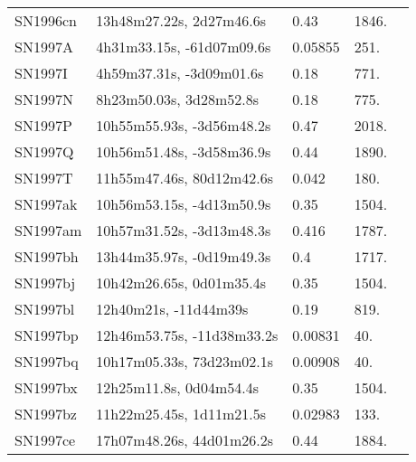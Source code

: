 \begin{longtable}{lllll}
         SN1996cn &       13h48m27.22s, 2d27m46.6s &     0.43 &          1846. &    \citet{1999ApJ...517..565P} \\
          SN1997A &      4h31m33.15s, -61d07m09.6s &  0.05855 &           251. &    \citet{2004AJ....128.1558S} \\
          SN1997I &       4h59m37.31s, -3d09m01.6s &     0.18 &           771. &    \citet{1997IAUC.6540A...1:} \\
          SN1997N &        8h23m50.03s, 3d28m52.8s &     0.18 &           775. &    \citet{1997IAUC.6540A...1:} \\
          SN1997P &      10h55m55.93s, -3d56m48.2s &     0.47 &          2018. &    \citet{1997IAUC.6540A...1:} \\
          SN1997Q &      10h56m51.48s, -3d58m36.9s &     0.44 &          1890. &    \citet{1997IAUC.6540A...1:} \\
          SN1997T &      11h55m47.46s, 80d12m42.6s &    0.042 &           180. &    \citet{1997IAUC.6557B...1F} \\
         SN1997ak &      10h56m53.15s, -4d13m50.9s &     0.35 &          1504. &    \citet{1997IAUC.6596A...1:} \\
         SN1997am &      10h57m31.52s, -3d13m48.3s &    0.416 &          1787. &    \citet{1999ApJ...517..565P} \\
         SN1997bh &      13h44m35.97s, -0d19m49.3s &      0.4 &          1717. &    \citet{1997IAUC.6602A...1:} \\
         SN1997bj &       10h42m26.65s, 0d01m35.4s &     0.35 &          1504. &    \citet{1997IAUC.6602A...1:} \\
         SN1997bl &          12h40m21s, -11d44m39s &     0.19 &           819. &    \citet{1997IAUC.6629C...1H} \\
         SN1997bp &     12h46m53.75s, -11d38m33.2s &  0.00831 &            40. &    \citet{1991RC3.9.C...0000d} \\
         SN1997bq &      10h17m05.33s, 73d23m02.1s &  0.00908 &            40. &    \citet{2008ApJ...676..184T} \\
         SN1997bx &        12h25m11.8s, 0d04m54.4s &     0.35 &          1504. &    \citet{1997IAUC.6633A...1G} \\
         SN1997bz &       11h22m25.45s, 1d11m21.5s &  0.02983 &           133. &    \citet{2003SDSS1.C...0000:} \\
         SN1997ce &      17h07m48.26s, 44d01m26.2s &     0.44 &          1884. &    \citet{1997IAUC.6633A...1G} \\

\end{longtable}
